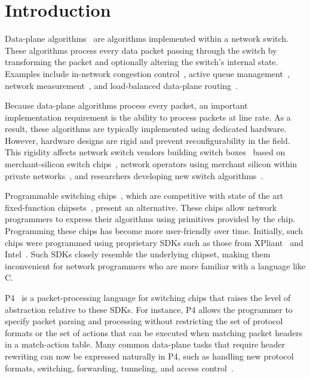 \section{Introduction}
\label{s:intro}

Data-plane algorithms~\cite{cestan} are algorithms implemented within a network
switch. These algorithms process every data packet passing through the switch
by transforming the packet and optionally altering the switch's internal state.
Examples include in-network congestion control~\cite{xcp, rcp, pdq, dctcp},
active queue management~\cite{codel}, network measurement~\cite{opensketch,
bitmap_george, elephant_george}, and load-balanced data-plane
routing~\cite{conga}.

Because data-plane algorithms process every packet, an important implementation
requirement is the ability to process packets at line rate.  As a result, these
algorithms are typically implemented using dedicated hardware. However,
hardware designs are rigid and prevent reconfigurability in the field. This
rigidity affects network switch vendors building switch
boxes~\cite{cisco_nexus, dell_force10, arista_7050} based on merchant-silicon
switch chips~\cite{trident, tomahawk, mellanox}, network operators using
merchant silicon within private networks~\cite{google,facebook,vl2}, and
researchers developing new switch algorithms~\cite{xcp, codel, d3, detail,
pdq}.
%

Programmable switching chips~\cite{flexpipe, xpliant, rmt}, which are
competitive with state of the art fixed-function chipsets~\cite{trident,
tomahawk, mellanox}, present an alternative.  These chips allow network
programmers to express their algorithms using primitives provided by the chip.
Programming these chips has become more user-friendly over time.  Initially,
such chips were programmed using proprietary SDKs such as those from
XPliant~\cite{xpliant_sdk, xpliant_sdk2} and Intel~\cite{intel_sdk}. Such SDKs
closely resemble the underlying chipset, making them inconvenient for network
programmers who are more familiar with a language like C.

P4~\cite{p4, p4spec} is a packet-processing language for switching chips that
raises the level of abstraction relative to these SDKs.  For instance, P4
allows the programmer to specify packet parsing and processing without
restricting the set of protocol formats or the set of actions that can be
executed when matching packet headers in a match-action table. Many common
data-plane tasks that require header rewriting can now be expressed
naturally in P4, such as handling new protocol formats, switching, forwarding,
tunneling, and access control~\cite{dc_p4}.

